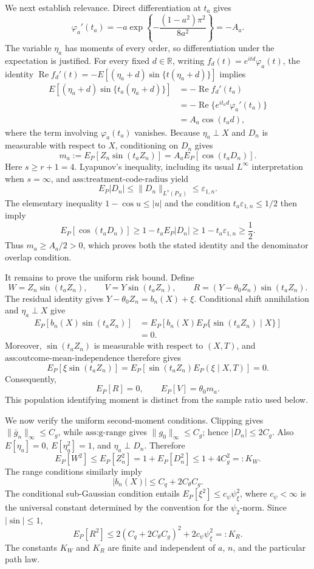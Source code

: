 We next establish relevance.  Direct differentiation at \(t_a\) gives
\[
 \varphi_a'(t_a)
 =-a\exp\!\left\{-\frac{(1-a^2)\pi^2}{8a^2}\right\}
 =-A_a.
\]
The variable \(\eta_a\) has moments of every order, so differentiation under
the expectation is justified.  For every fixed \(d\in\mathbb R\), writing
\(f_d(t)=e^{itd}\varphi_a(t)\), the identity
\(\operatorname{Re} f_d'(t)=-E[(\eta_a+d)\sin\{t(\eta_a+d)\}]\)
implies
\[
\begin{aligned}
 E[(\eta_a+d)\sin\{t_a(\eta_a+d)\}]
 &=-\operatorname{Re} f_d'(t_a)\\
 &=-\operatorname{Re}\{e^{it_ad}\varphi_a'(t_a)\}\\
 &=A_a\cos(t_ad),
\end{aligned}
\]
where the term involving \(\varphi_a(t_a)\) vanishes.  Because
\(\eta_a\perp X\) and \(D_n\) is measurable with respect to \(X\),
conditioning on \(D_n\) gives
\[
 m_a:=E_P[Z_n\sin(t_aZ_n)]
 =A_aE_P[\cos(t_aD_n)].
\]
Here \(s\geq r+1=4\).  Lyapunov's inequality, including its usual
\(L^{\infty}\) interpretation when \(s=\infty\), and
\(\text{ass:treatment-code-radius}\) yield
\[
 E_P|D_n|
 \leq\|D_n\|_{L^s(P_X)}
 \leq\varepsilon_{1,n}.
\]
The elementary inequality \(1-\cos u\leq |u|\) and the condition
\(t_a\varepsilon_{1,n}\leq1/2\) then imply
\[
 E_P[\cos(t_aD_n)]
 \geq1-t_aE_P|D_n|
 \geq1-t_a\varepsilon_{1,n}
 \geq\frac12.
\]
Thus \(m_a\geq A_a/2>0\), which proves both the stated identity and the
denominator overlap condition.

It remains to prove the uniform risk bound.  Define
\[
 W=Z_n\sin(t_aZ_n),\qquad
 V=Y\sin(t_aZ_n),\qquad
 R=(Y-\theta_0Z_n)\sin(t_aZ_n).
\]
The residual identity gives \(Y-\theta_0Z_n=b_n(X)+\xi\).  Conditional
shift annihilation and \(\eta_a\perp X\) give
\[
\begin{aligned}
 E_P[b_n(X)\sin(t_aZ_n)]
 &=E_P\!\left[b_n(X)E_P\{\sin(t_aZ_n)\mid X\}\right]\\
 &=0.
\end{aligned}
\]
Moreover, \(\sin(t_aZ_n)\) is measurable with respect to \((X,T)\), and
\(\text{ass:outcome-mean-independence}\) therefore gives
\[
 E_P[\xi\sin(t_aZ_n)]
 =E_P\!\left[\sin(t_aZ_n)E_P(\xi\mid X,T)\right]
 =0.
\]
Consequently,
\[
 E_P[R]=0,
 \qquad
 E_P[V]=\theta_0m_a.
\]
This population identifying moment is distinct from the sample ratio used
below.

We now verify the uniform second-moment conditions.  Clipping gives
\(\|\bar g_n\|_{\infty}\leq C_g\), while
\(\text{ass:g-range}\) gives \(\|g_0\|_{\infty}\leq C_g\); hence
\(|D_n|\leq2C_g\).  Also \(E[\eta_a]=0\),
\(E[\eta_a^2]=1\), and \(\eta_a\perp D_n\).  Therefore
\[
 E_P[W^2]
 \leq E_P[Z_n^2]
 =1+E_P[D_n^2]
 \leq1+4C_g^2
 =:K_W.
\]
The range conditions similarly imply
\[
 |b_n(X)|
 \leq C_q+2C_{\theta}C_g.
\]
The conditional sub-Gaussian condition entails
\(E_P[\xi^2]\leq c_{\psi}\psi_{\xi}^2\), where \(c_{\psi}<\infty\)
is the universal constant determined by the convention for the
\(\psi_2\)-norm.  Since \(|\sin|\leq1\),
\[
 E_P[R^2]
 \leq2(C_q+2C_{\theta}C_g)^2+2c_{\psi}\psi_{\xi}^2
 =:K_R.
\]
The constants \(K_W\) and \(K_R\) are finite and independent of \(a\),
\(n\), and the particular path law.

